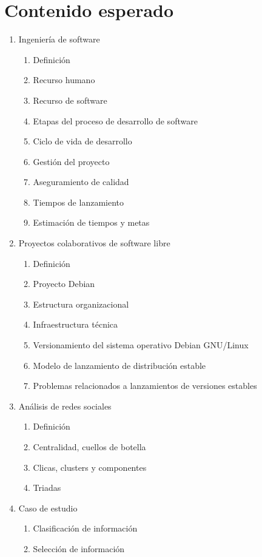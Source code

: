 \documentclass[12pt]{report}
\begin{document}
\chapter*{Contenido esperado}
\begin{enumerate}
\item Ingeniería de software
  \begin{enumerate}
  \item Definición
  \item Recurso humano
  \item Recurso de software
  \item Etapas del proceso de desarrollo de software
  \item Ciclo de vida de desarrollo
  \item Gestión del proyecto
  \item Aseguramiento de calidad    
  \item Tiempos de lanzamiento
  \item Estimación de tiempos y metas
  \end{enumerate}
\item Proyectos colaborativos de software libre
  \begin{enumerate}
  \item Definición
  \item Proyecto Debian
  \item Estructura organizacional
  \item Infraestructura técnica
  \item Versionamiento del sistema operativo Debian GNU/Linux
  \item Modelo de lanzamiento de distribución estable
  \item Problemas relacionados a lanzamientos de versiones estables
  \end{enumerate}
\item Análisis de redes sociales
  \begin{enumerate}
  \item Definición
  \item Centralidad, cuellos de botella
  \item Clicas, clusters y componentes
  \item Triadas
  \end{enumerate}
\item Caso de estudio
  \begin{enumerate}
  \item Clasificación de información
  \item Selección de información

\end{enumerate}
\end{enumerate}
\end{document}
